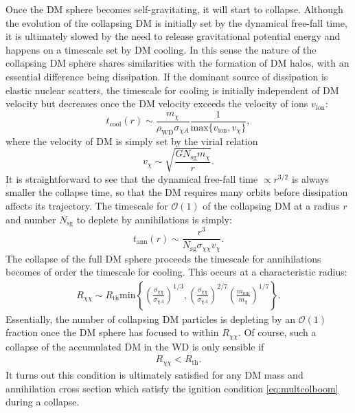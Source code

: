 \documentclass[preprintnumbers,amsmath,amssymb,prd,superscriptaddress]{revtex4}
\newcommand{\OO}{\mathcal{O}}
\def\r{\right)}
\def\l{\left(}
\begin{document}
Once the DM sphere becomes self-gravitating, it will start to collapse. 
Although the evolution of the collapsing DM is initially set by the dynamical free-fall time, it is ultimately slowed by the need to release gravitational potential energy and happens on a timescale set by DM cooling. 
In this sense the nature of the collapsing DM sphere shares similarities with the formation of DM halos, with an essential difference being dissipation. 
If the dominant source of dissipation is elastic nuclear scatters, the timescale for cooling is initially independent of DM velocity but decreases once the DM velocity exceeds the velocity of ions $v_\text{ion}$:
\begin{equation}
t_\text{cool}(r) \sim \frac{m_\chi}{\rho_\text{WD} \sigma_{\chi A}} \frac{1}{\text{max}\{{v_\text{ion},v_\chi\}}},
\end{equation}
where the velocity of DM is simply set by the virial relation 
\begin{equation}
v_\chi \sim \sqrt{\frac{G N_\text{sg} m_\chi}{r}}. 
\end{equation}
It is straightforward to see that the dynamical free-fall time $\propto r^{3/2}$ is always smaller the collapse time, so that the DM requires many orbits before dissipation affects its trajectory. 
The timescale for $\OO(1)$ of the collapsing DM at a radius $r$ and number $N_\text{sg}$ to deplete by annihilations is simply:
\begin{equation}
t_\text{ann}(r) \sim \frac{r^3}{N_\text{sg} \sigma_{\chi \chi} v_\chi}. 
\end{equation}
The collapse of the full DM sphere proceeds the timescale for annihilations becomes of order the timescale for cooling.
This occurs at a characteristic radius:
\begin{align}
R_{\chi \chi} \sim R_\text{th}  \text{min} \left \{ \l \frac{\sigma_{\chi \chi}}{\sigma_{\chi A}}\r^{1/3}, \l \frac{\sigma_{\chi \chi}}{\sigma_{\chi A}}\r^{2/7} \l \frac{m_\text{ion}}{m_\chi} \r^{1/7} \right \}.
\end{align}
Essentially, the number of collapsing DM particles is depleting by an $\OO(1)$ fraction once the DM sphere has focused to within $R_{\chi \chi}$.
Of course, such a collapse of the accumulated DM in the WD is only sensible if
\begin{align}
\label{eq:xicondition}
R_{\chi \chi} < R_\text{th}.
\end{align}
It turns out this condition is ultimately satisfied for any DM mass and annihilation cross section which satisfy the ignition condition \eqref{eq:multcolboom} during a collapse. 
\end{document}
